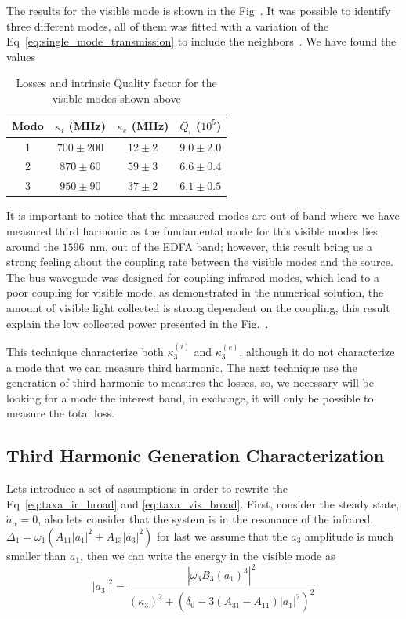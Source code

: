 The results for the visible mode is shown in the Fig~. It was possible to identify three different modes, all of them  was fitted with a variation of the Eq~\ref{eq:single_mode_transmission} to include the neighbors~\needcit. We have found the values
\begin{table}[h]
\centering
\begin{tabularx}{8cm}{c|c|c|c}
Modo & $\kappa_i$ (MHz) & $\kappa_e$ (MHz) & $Q_i$ ($10^5$) \\ 
\hline                               
1 &$700\pm200$&$12\pm2$&$9.0\pm2.0$\\
2 &$870\pm60$&$59\pm3$&$6.6\pm0.4$\\
3 &$950\pm90$&$37\pm2$&$6.1\pm0.5$
\end{tabularx}
\caption{Losses and intrinsic Quality factor for the visible modes shown above}
\end{table}

It is important to notice that the measured modes are out of band where we have measured third harmonic as the fundamental mode for this visible modes lies around the $1596$~nm, out of the EDFA band; however, this result bring us a strong feeling about the coupling rate between the visible modes and the source. The bus waveguide was designed for coupling infrared modes, which lead to a poor coupling for visible mode, as demonstrated in the numerical solution, the amount of visible light collected is strong dependent on the coupling, this result explain the low collected power presented in the Fig.~.

This technique characterize both $\kappa_3^{(i)}$ and $\kappa_3^{(e)}$, although it do not characterize a mode that we can measure third harmonic. The next technique use the generation of third harmonic to measures the losses, so, we necessary will be looking for a mode the interest band, in exchange, it will only be possible to measure the total loss. 

\subsection{Third Harmonic Generation Characterization}

Lets introduce a set of assumptions in order to rewrite the Eq~\ref{eq:taxa_ir_broad} and \ref{eq:taxa_vis_broad}. First, consider the steady state, $\dot{a}_\alpha = 0$, also lets consider that the system is in the resonance of the infrared, $\Delta_1 = \omega_1(A_{11}|a_1|^2+A_{13}|a_3|^2)$ for last we assume that the $a_3$ amplitude is much smaller than $a_1$, then we can write the energy in the visible mode as
\begin{equation}
    |a_3|^2 = \frac{|\omega_3 B_3 (a_1)^3|^2}{\left(\kappa_3\right)^2 + \left(\delta_0 - 3(A_{31}-A_{11})|a_1|^2\right)^2}
    \label{eq:thg_phase_mismatch}
\end{equation}

